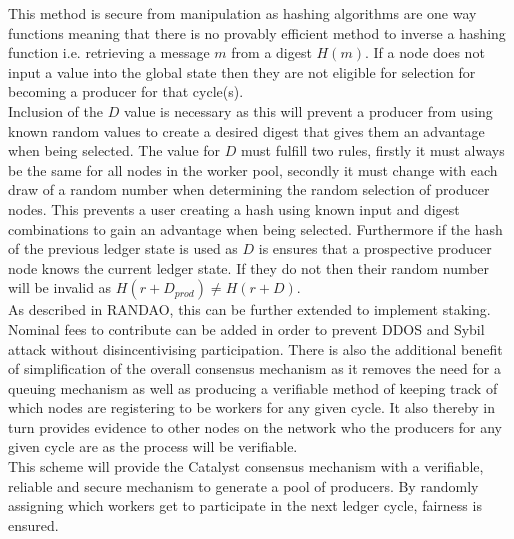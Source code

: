 This method is secure from manipulation as hashing algorithms are one way functions meaning that there is no provably efficient method to inverse a hashing function i.e. retrieving a message $m$ from a digest $H(m)$. If a node does not input a value into the global state then they are not eligible for selection for becoming a producer for that cycle(s). \\

Inclusion of the $D$ value is necessary as this will prevent a producer from using known random values to create a desired digest that gives them an advantage when being selected. The value for $D$ must fulfill two rules, firstly it must always be the same for all nodes in the worker pool, secondly it must change with each draw of a random number when determining the random selection of producer nodes. This prevents a user creating a hash using known input and digest combinations to gain an advantage when being selected. Furthermore if the hash of the previous ledger state is used as $D$ is ensures that a prospective producer node knows the current ledger state. If they do not then their random number will be invalid as $H(r + D_{prod}) \neq H(r + D)$. \\

As described in RANDAO, this can be further extended to implement staking. Nominal fees to contribute can be added in order to prevent DDOS and Sybil attack without disincentivising participation. There is also the additional benefit of simplification of the overall consensus mechanism as it removes the need for a queuing mechanism as well as producing a verifiable method of keeping track of which nodes are registering to be workers for any given cycle. It also thereby in turn provides evidence to other nodes on the network who the producers for any given cycle are as the process will be verifiable. \\

This scheme will provide the Catalyst consensus mechanism with a verifiable, reliable and secure mechanism to generate a pool of producers. By randomly assigning which workers get to participate in the next ledger cycle, fairness is ensured. \\
